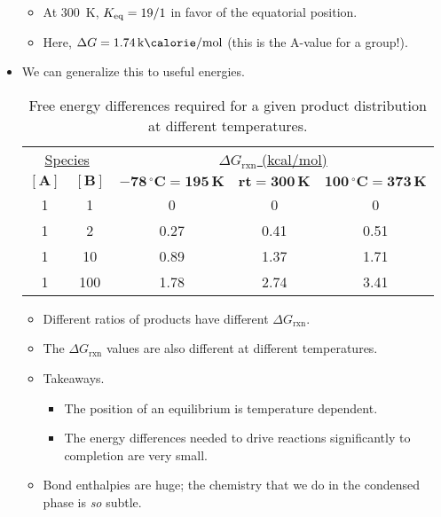 \documentclass[../notes.tex]{subfiles}
\begin{document}
\begin{itemize}
    \begin{itemize}
        \item At \SI{300}{\kelvin}, $K_\textup{eq}=19/1$ in favor of the equatorial position.
        \item Here, $\Delta G=\kcal{1.74}$ (this is the A-value for a  group!).
    \end{itemize}
    \item We can generalize this to useful energies.
    \begin{table}[h!]
        \centering
        \small
        \renewcommand{\arraystretch}{1.2}
        \begin{tabular}{ccccc}
            \multicolumn{2}{c}{\underline{Species}} & \multicolumn{3}{c}{\underline{$\Delta G_\text{rxn}$ (kcal/mol)}}\\[1mm]
            $\bm{[\textbf{A}]}$ & $\bm{[\textbf{B}]}$ & $\bm{-78\,{}^\circ\textbf{C}=195\,\textbf{K}}$ & $\bm{\textbf{rt}=300\,\textbf{K}}$ & $\bm{100\,{}^\circ\textbf{C}=373\,\textbf{K}}$\\
            \hline
            1 & 1   & 0    & 0    & 0   \\
            1 & 2   & 0.27 & 0.41 & 0.51\\
            1 & 10  & 0.89 & 1.37 & 1.71\\
            1 & 100 & 1.78 & 2.74 & 3.41\\
        \end{tabular}
        \caption{Free energy differences required for a given product distribution at different temperatures.}
        \label{tab:energyProductTemp}
    \end{table}
    \begin{itemize}
        \item Different ratios of products have different $\Delta G_\text{rxn}$.
        \item The $\Delta G_\text{rxn}$ values are also different at different temperatures.
        \item Takeaways.
        \begin{itemize}
            \item The position of an equilibrium is temperature dependent.
            \item The energy differences needed to drive reactions significantly to completion are very small.
        \end{itemize}
        \item Bond enthalpies are huge; the chemistry that we do in the condensed phase is \emph{so} subtle.

\end{itemize}
\end{itemize}
\end{document}
